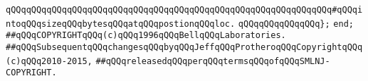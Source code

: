 \verb|qQQqqQQqqQQqqQQqqQQqqQQqqQQqqQQqqQQqqQQqqQQqqQQqqQQqqQQqqQQqqQQq#qQQqintoqQQqsizeqQQqbytesqQQqatqQQqpostionqQQqloc.|\newline
\verb|qQQqqQQqqQQqqQQq};|\newline
\verb|end;|\newline
\newline
\newline
\newline
\verb|##qQQqCOPYRIGHTqQQq(c)qQQq1996qQQqBellqQQqLaboratories.|\newline
\verb|##qQQqSubsequentqQQqchangesqQQqbyqQQqJeffqQQqProtheroqQQqCopyrightqQQq(c)qQQq2010-2015,|\newline
\verb|##qQQqreleasedqQQqperqQQqtermsqQQqofqQQqSMLNJ-COPYRIGHT.|\newline

